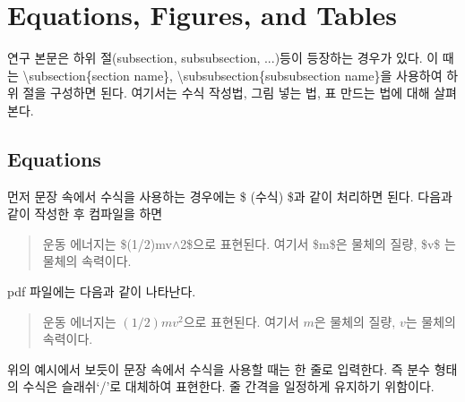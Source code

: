 \documentclass[twoside,11pt]{gshs_thesis}
\begin{document}
\section{Equations, Figures, and Tables}
연구 본문은 하위 절(subsection, subsubsection, ...)등이 등장하는 경우가 있다. 이 때는 {\textbackslash}subsection\{section name\}, {\textbackslash}subsubsection\{subsubsection name\}을 사용하여 하위 절을 구성하면 된다. 여기서는 수식 작성법, 그림 넣는 법, 표 만드는 법에 대해 살펴본다.

\subsection{Equations}

먼저 문장 속에서 수식을 사용하는 경우에는 \$ (수식) \$과 같이 처리하면 된다. 다음과 같이 작성한 후 컴파일을 하면
\begin{quote}
운동 에너지는 \$(1/2)mv$\wedge$2\$으로 표현된다. 여기서 \$m\$은 물체의 질량, \$v\$ 는 물체의 속력이다.
\end{quote}
pdf 파일에는 다음과 같이 나타난다.
\begin{quote}
운동 에너지는 $(1/2)mv^2$으로 표현된다. 여기서 $m$은 물체의 질량, $v$는 물체의 속력이다.
\end{quote}
위의 예시에서 보듯이 문장 속에서 수식을 사용할 때는 한 줄로 입력한다. 즉 분수 형태의 수식은 슬래쉬`/'로 대체하여 표현한다. 줄 간격을 일정하게 유지하기 위함이다.
\end{document}
